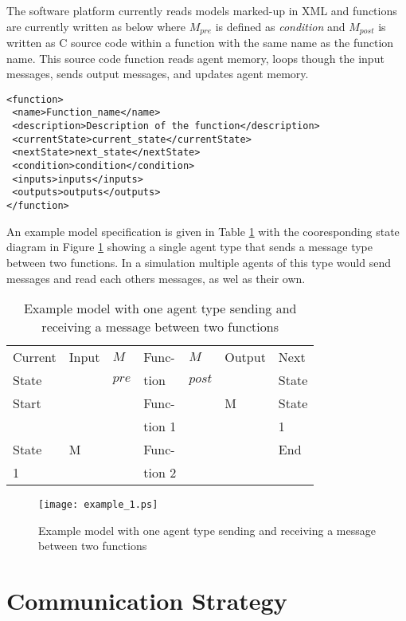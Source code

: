 \documentclass{aamas2009}
\newenvironment{mylisting}
{\begin{list}{}{\setlength{\leftmargin}{1em}}\item\small\bfseries}
{\end{list}}
\begin{document}
The software platform currently reads models marked-up in XML and functions are
currently written as below where $M_{pre}$ is defined as \textit{condition} and
$M_{post}$ is written as C source code within a function with the same name as
the function name. This source code function reads agent memory, loops though
the input messages, sends output messages, and updates agent memory.

\begin{mylisting}
\begin{verbatim}
<function>
 <name>Function_name</name>
 <description>Description of the function</description>
 <currentState>current_state</currentState>
 <nextState>next_state</nextState>
 <condition>condition</condition>
 <inputs>inputs</inputs>
 <outputs>outputs</outputs>
</function>
\end{verbatim}
\end{mylisting}

An example model specification is given in Table \ref{tab:simpleexample} with
the cooresponding state diagram in Figure \ref{tab:simpleexample} showing a
single agent type that sends a message type between two functions. In a
simulation multiple agents of this type would send messages and read each others
messages, as wel as their own.

\begin{table}[hbp]
\centering
\begin{tabular}{|l|l|l||l||l|l|l|}
\hline
Current&Input&$M$&Func-&$M$&Output&Next\\
State&&$pre$&tion&$post$&&State\\
\hline
\hline
Start&&&Func-&&M&State\\
&&&tion 1&&&1\\
\hline
State&M&&Func-&&&End\\
1&&&tion 2&&&\\
\hline
\end{tabular}
\caption{Example model with one agent type sending and receiving a message
between two functions}
\label{tab:simpleexample}
\end{table}

\begin{figure}[hbp]
\centering
\texttt{[image: example\_1.ps]}
\caption{Example model with one agent type sending and receiving a message
between two functions}
\label{fig:simpleexample}
\end{figure}

\section{Communication Strategy}
\end{document}
